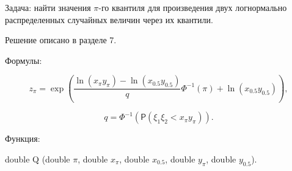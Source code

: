 \documentclass[12pt]{article}
\begin{document}
	Задача:
	найти значения $\pi$-го квантиля для произведения двух логнормально распределенных случайных величин через их квантили.
	
	Решение описано в разделе 7.
	
	Формулы:
	
	\begin{equation*}
		z_{\pi}=\exp\left(\dfrac{\ln(x_{\pi}y_{\pi})-\ln(x_{0.5}y_{0.5})}{q}\Phi^{-1}(\pi)+\ln(x_{0.5}y_{0.5})\right),
	\end{equation*}
	
	\begin{equation*}
		q=\Phi^{-1}(\mathsf{P}(\xi_{1}\xi_{2}< x_{\pi}y_{\pi})).
	\end{equation*}
	
	Функция:
	
	double Q (double $\pi$, double $x_{\pi}$, double $x_{0.5}$, double $y_{\pi}$, double $y_{0.5}$).
	
	
	
\end{document}
